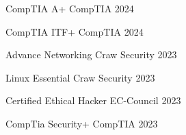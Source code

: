 

\begin{cvhonors}

    
 \cvhonor
    {CompTIA A+} %
    {CompTIA} %
    {} %
    {2024} %

\cvhonor
    {CompTIA ITF+} %
    {CompTIA} %
    {} %
    {2024} %

\cvhonor
    {Advance Networking} %
    {Craw Security} %
    {} %
    {2023} %

\cvhonor
    {Linux Essential} %
    {Craw Security} %
    {} %
    {2023} %

\cvhonor
    {Certified Ethical Hacker} %
    {EC-Council} %
    {} %
    {2023} %

\cvhonor
    {CompTia Security+} %
    {CompTIA} %
    {} %
    {2023} %



\end{cvhonors}

